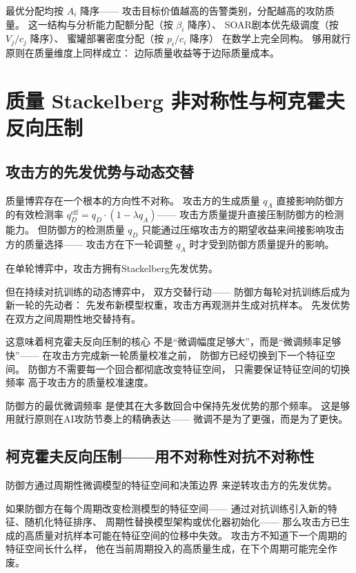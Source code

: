 \documentclass[11pt,a4paper]{article}
\begin{document}
最优分配均按 \(A_i\) 降序——
攻击目标价值越高的告警类别，分配越高的攻防质量。
这一结构与分析能力配额分配（按 \(\beta_i\) 降序）、
SOAR剧本优先级调度（按 \(V_j/c_j\) 降序）、
蜜罐部署密度分配（按 \(p_i/c_i\) 降序）
在数学上完全同构。
够用就行原则在质量维度上同样成立：
边际质量收益等于边际质量成本。

\section{质量 Stackelberg 非对称性与柯克霍夫反向压制}

\subsection{攻击方的先发优势与动态交替}

质量博弈存在一个根本的方向性不对称。
攻击方的生成质量 \(q_A\) 直接影响防御方的有效检测率
\(q_D^{\text{eff}} = q_D \cdot (1 - \lambda q_A)\)——
攻击方质量提升直接压制防御方的检测能力。
但防御方的检测质量 \(q_D\)
只能通过压缩攻击方的期望收益来间接影响攻击方的质量选择——
攻击方在下一轮调整 \(q_A\) 时才受到防御方质量提升的影响。

在单轮博弈中，攻击方拥有Stackelberg先发优势。

但在持续对抗训练的动态博弈中，
双方交替行动——
防御方每轮对抗训练后成为新一轮的先动者：
先发布新模型权重，攻击方再观测并生成对抗样本。
先发优势在双方之间周期性地交替持有。

这意味着柯克霍夫反向压制的核心
不是“微调幅度足够大”，而是“微调频率足够快”——
在攻击方完成新一轮质量校准之前，
防御方已经切换到下一个特征空间。
防御方不需要每一个回合都彻底改变特征空间，
只需要保证特征空间的切换频率
高于攻击方的质量校准速度。

防御方的最优微调频率
是使其在大多数回合中保持先发优势的那个频率。
这是够用就行原则在AI攻防节奏上的精确表达——
微调不是为了更强，而是为了更快。

\subsection{柯克霍夫反向压制——用不对称性对抗不对称性}

防御方通过周期性微调模型的特征空间和决策边界
来逆转攻击方的先发优势。

如果防御方在每个周期改变检测模型的特征空间——
通过对抗训练引入新的特征、随机化特征排序、
周期性替换模型架构或优化器初始化——
那么攻击方已生成的高质量对抗样本可能在特征空间的位移中失效。
攻击方不知道下一个周期的特征空间长什么样，
他在当前周期投入的高质量生成，在下个周期可能完全作废。
\end{document}
